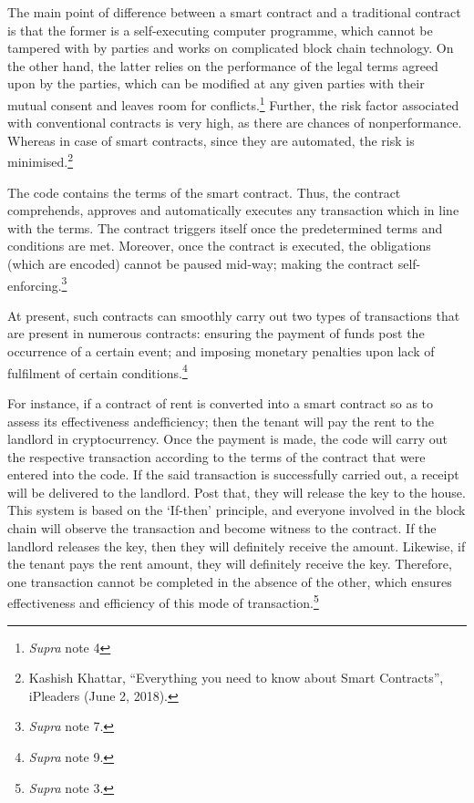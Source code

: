 \begin{multicols}{2}
\noi
The main point of difference between a smart contract and a traditional contract is that the
former is a self-executing computer programme, which cannot be tampered with by parties
and works on complicated block chain technology. On the other hand, the latter relies on the
performance of the legal terms agreed upon by the parties, which can be modified at any
given parties with their mutual consent and leaves room for conflicts.\footnote{\textit{Supra} note 4} Further, the risk
factor associated with conventional contracts is very high, as there are chances of nonperformance. Whereas in case of smart contracts, since they are automated, the risk is
minimised.\footnote{Kashish Khattar, “Everything you need to know about Smart Contracts”, iPleaders (June 2, 2018).}


\noi
The code contains the terms of the smart contract. Thus, the contract comprehends, approves
and automatically executes any transaction which in line with the terms. The contract triggers
itself once the predetermined terms and conditions are met. Moreover, once the contract is
executed, the obligations (which are encoded) cannot be paused mid-way; making the
contract self-enforcing.\footnote{\textit{Supra} note 7.}

\noi
At present, such contracts can smoothly carry out two types of transactions that are present in
numerous contracts: ensuring the payment of funds post the occurrence of a certain event;
and imposing monetary penalties upon lack of fulfilment of certain conditions.\footnote{\textit{Supra} note 9.}

\newpage

\noi
For instance, if a contract of rent is converted into a smart contract so as to assess its
effectiveness and\break efficiency; then the tenant will pay the rent to the landlord in
cryptocurrency. Once the payment is made, the code will carry out the respective transaction
according to the terms of the contract that were entered into the code. If the said transaction is
successfully carried out, a receipt will be delivered to the landlord. Post that, they will release
the key to the house. This system is based on the ‘If-then’ principle, and everyone involved in
the block chain will observe the transaction and become witness to the contract. If the
landlord releases the key, then they will definitely receive the amount. Likewise, if the tenant
pays the rent amount, they will definitely receive the key. Therefore, one transaction cannot
be completed in the absence of the other, which ensures effectiveness and efficiency of this
mode of transaction.\footnote{\textit{Supra} note 3.}


\end{multicols}
